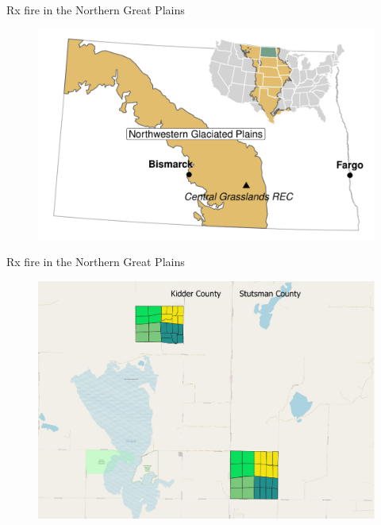 \documentclass[11pt]{beamer}
\begin{document}
\begin{frame}{Rx fire in the Northern Great Plains}
	\begin{center}
		\begin{figure}
			\includegraphics[width=1\linewidth]{figs/region_map-1.pdf} 
		\end{figure}
	\end{center}
\end{frame}

\begin{frame}{Rx fire in the Northern Great Plains}
	\begin{center}
		\begin{figure}
			\includegraphics[width=1\linewidth]{figs/PBGmaps} 
		\end{figure}
	\end{center}
\end{frame}
\end{document}
